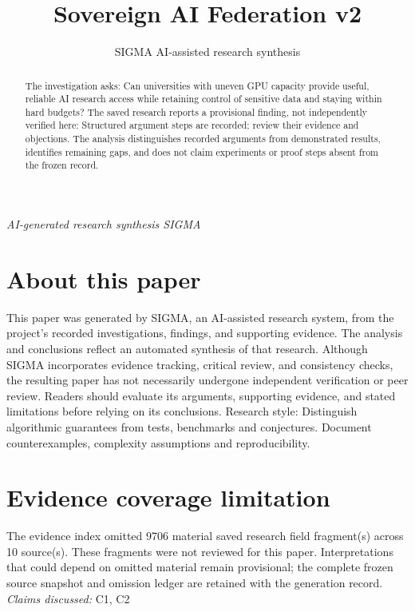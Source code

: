\documentclass[11pt]{article}
\title{Sovereign AI Federation v2}
\date{}
\author{SIGMA AI-assisted research synthesis}
\begin{document}
\maketitle
\begin{center}\end{center}
\begin{center}\small\textit{AI-generated research synthesis \textperiodcentered{} SIGMA}\end{center}

\begin{abstract}
The investigation asks: Can universities with uneven GPU capacity provide useful, reliable AI research access while retaining control of sensitive data and staying within hard budgets? The saved research reports a provisional finding, not independently verified here: Structured argument steps are recorded; review their evidence and objections. The analysis distinguishes recorded arguments from demonstrated results, identifies remaining gaps, and does not claim experiments or proof steps absent from the frozen record.
\end{abstract}
\section*{About this paper}
This paper was generated by SIGMA, an AI-assisted research system, from the project's recorded investigations, findings, and supporting evidence.
The analysis and conclusions reflect an automated synthesis of that research. Although SIGMA incorporates evidence tracking, critical review, and consistency checks, the resulting paper has not necessarily undergone independent verification or peer review.
Readers should evaluate its arguments, supporting evidence, and stated limitations before relying on its conclusions.
Research style: Distinguish algorithmic guarantees from tests, benchmarks and conjectures. Document counterexamples, complexity assumptions and reproducibility.
\section*{Evidence coverage limitation}
The evidence index omitted 9706 material saved research field fragment(s) across 10 source(s). These fragments were not reviewed for this paper. Interpretations that could depend on omitted material remain provisional; the complete frozen source snapshot and omission ledger are retained with the generation record.
\textit{Claims discussed: }C1, C2
\end{document}

